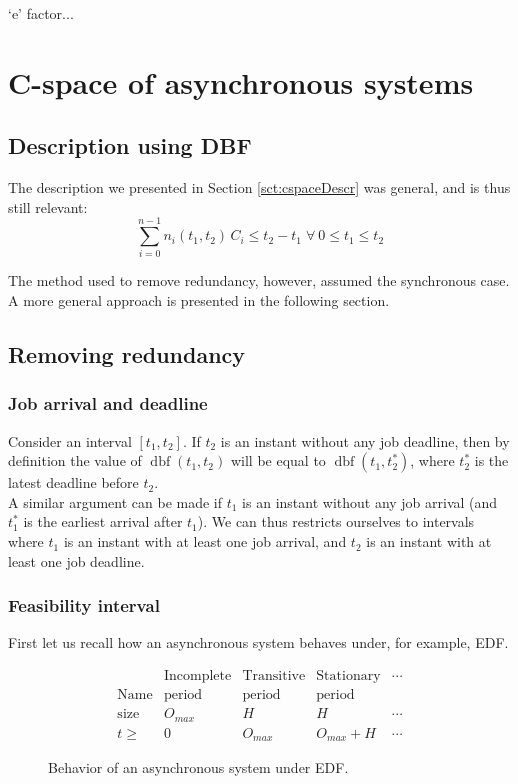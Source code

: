 \documentclass[times, 10pt,twocolumn, a4paper]{article}
\newcommand{\dbf}[1]{\operatorname{dbf}(#1)}
\begin{document}
  `e' factor...

\section{C-space of asynchronous systems}
  \label{sct:asyncCspace}

  \subsection{Description using DBF}

  The description we presented in Section \ref{sct:cspaceDescr} was general, and is thus still relevant: $$\sum_{i=0}^{n-1} n_i(t_1, t_2) \, C_i \leq t_2 - t_1 \; \forall \: 0 \leq t_1 \leq t_2$$

  The method used to remove redundancy, however, assumed the synchronous case. A more general approach is presented in the following section.

  \subsection{Removing redundancy}

\subsubsection{Job arrival and deadline}

Consider an interval $[t_1, t_2]$. If $t_2$ is an instant without any job deadline, then by definition the value of $\dbf{t_1, t_2}$ will be equal to $\dbf{t_1, t_2^*}$, where $t_2^*$ is the latest deadline before $t_2$.\\

A similar argument can be made if $t_1$ is an instant without any job arrival (and $t_1^*$ is the earliest arrival after $t_1$). We can thus restricts ourselves to intervals where $t_1$ is an instant with at least one job arrival, and $t_2$ is an instant with at least one job deadline.

  \subsubsection{Feasibility interval}

  First let us recall how an asynchronous system behaves under, for example, EDF.\\

\begin{figure}[h]
	\[
		\begin{array}{r||c|c|c|l}
			& \text{Incomplete} & \text{Transitive} & \text{Stationary} & \cdots \\
			\text{Name} & \text{period} & \text{period} & \text{period}  & \\
			\hline
			\text{size} & O_{max} & H & H & \cdots \\
			\hline
			t \geqslant & 0 & O_{max} & O_{max} + H & \cdots
		\end{array}
	\]
	\begin{center}
	\caption{Behavior of an asynchronous system under EDF.}
	\label{fig:asyncBehavior}
	\end{center}
\end{figure}
\end{document}
